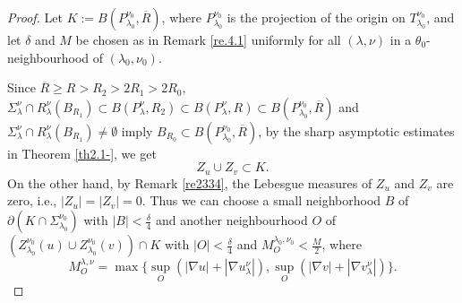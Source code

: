 \documentclass[10pt,a4paper]{amsart}
\begin{document}
\begin{proof}
Let $K:=B(P_{\lambda_0}^{\nu_0},\overline{R})$, where $P_{\lambda_0}^{\nu_0}$ is the projection of the origin on $T_{\lambda_0}^{\nu_0}$, and let $\delta$ and $M$ be chosen as in Remark \ref{re.4.1} uniformly for all $(\lambda,\nu)$ in a $\theta_0$-neighbourhood of $(\lambda_0,\nu_0)$.

Since $\overline{R}\geq R>R_{2}>2R_{1}>2R_{0}$, $\Sigma_\lambda^\nu \cap R_\lambda^\nu(B_{R_1}) \subset B(P_\lambda^\nu,R_2) \subset B(P_\lambda^\nu,R)\subset B(P_{\lambda_0}^{\nu_0},\overline{R})$ and $\Sigma_\lambda^\nu \cap R_\lambda^\nu(B_{R_1}) \neq \emptyset$ imply $B_{R_0}\subset B(P_{\lambda_0}^{\nu_{0}},\overline{R})$, by the sharp asymptotic estimates in Theorem \ref{th2.1-}, we get
$$Z_u\cup Z_v\subset K.$$
On the other hand, by Remark \ref{re2334}, the Lebesgue measures of $Z_{u}$ and $Z_{v}$ are zero, i.e., $|Z_u|=|Z_v|=0$.  Thus we can choose a small neighborhood $B$ of $\partial\left(K\cap \Sigma_{\lambda_0}^{\nu_0}\right)$ with $|B|<\frac{\delta}{4}$ and another neighbourhood $O$ of $(Z_{\lambda_0}^{\nu_0}(u)\cup Z_{\lambda_0}^{\nu_0}(v)) \cap K$ with $|O|<\frac{\delta}{4}$ and $M_O^{\lambda_0,\nu_0}<\frac{M}{2}$, where
$$ M_O^{\lambda,\nu}=\max\{\sup_O (|\nabla u|+|\nabla u^{\nu}_{\lambda}|), \sup_O (|\nabla v|+|\nabla v^{\nu}_{\lambda}|)\} .$$


\end{proof}
\end{document}
